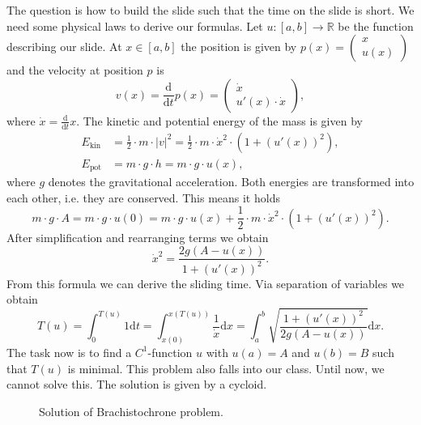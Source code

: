 \begin{example}
The question is how to build the slide such that the time on the slide is short. We need some physical laws to derive our formulas. Let $u:[a,b]\longrightarrow\mathbb{R}$ be the function describing our slide. At $x\in[a,b]$ the position is given by $p(x)=\begin{pmatrix}x\\u(x)\end{pmatrix}$ and the velocity at position $p$ is
\[v(x)=\frac{\mathrm{d}}{\mathrm{d}t}p(x)=\begin{pmatrix}\dot x\\u'(x)\cdot\dot x\end{pmatrix},\]
where $\dot x=\frac{\mathrm{d}}{\mathrm{d}t}x$. The kinetic and potential energy of the mass is given by
\begin{align*}
	E_{\text{kin}}&=\frac{1}{2}\cdot m\cdot\lvert v\rvert^2=\frac{1}{2}\cdot m\cdot\dot x^2\cdot(1+(u'(x))^2),\\
	E_{\text{pot}}&=m\cdot g\cdot h=m\cdot g\cdot u(x),
\end{align*}
where $g$ denotes the gravitational acceleration. Both energies are transformed into each other, i.e. they are conserved. This means it holds
\[m\cdot g\cdot A=m\cdot g\cdot u(0)=m\cdot g\cdot u(x)+\frac{1}{2}\cdot m\cdot\dot x^2\cdot(1+(u'(x))^2).\]
After simplification and rearranging terms we obtain
\[\dot x^2=\frac{2g(A-u(x))}{1+(u'(x))^2}.\]
From this formula we can derive the sliding time. Via separation of variables we obtain
\[T(u)=\int_0^{T(u)}{1\mathrm{d}t}=\int_{x(0)}^{x(T(u))}{\frac{1}{\dot x}\mathrm{d}x}=\int_a^b{\sqrt{\frac{1+(u'(x))^2}{2g(A-u(x))}}\mathrm{d}x}.\]
The task now is to find a $C^1$-function $u$ with $u(a)=A$ and $u(b)=B$ such that $T(u)$ is minimal. This problem also falls into our class. Until now, we cannot solve this. The solution is given by a cycloid.
\begin{figure}[ht]
	\centering
	\caption{Solution of Brachistochrone problem.}
\end{figure}\\
\end{example}
